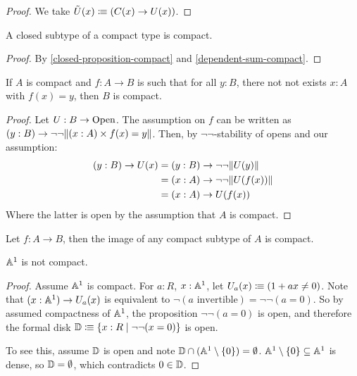 \begin{proof}
  We take $\tilde{U}(x)\vcentcolon\mspace{-1.2mu}\equiv (C(x)\to U(x))$.
\end{proof}

\begin{lemma}
  \label{closed-subtype-compact}
  A closed subtype of a compact type is compact.
\end{lemma}

\begin{proof}
  By \cref{closed-proposition-compact} and \cref{dependent-sum-compact}.
\end{proof}

\begin{lemma}
  \label{not-not-surjection-compact}
  If $A$ is compact and $f:A\to B$ is such that for all $y:B$,
  there not not exists $x:A$ with $f(x)=y$,
  then $B$ is compact.
\end{lemma}

\begin{proof}
  Let $U:B\to\mathrm{Open}$.
  The assumption on $f$ can be written as $(y:B)\to \neg\neg \lVert  (x:A)\times f(x)=y  \rVert$.
  Then, by $\neg\neg$-stability of opens and our assumption:
  \begin{align*}
    (y:B)\to U(x) &= (y:B)\to \neg\neg \lVert  U(y)  \rVert \\
                  &= (x:A)\to \neg\neg \lVert  U(f(x))  \rVert \\
                  &= (x:A)\to U(f(x))
  \end{align*}
  Where the latter is open by the assumption that $A$ is compact.
\end{proof}

\begin{corollary}
  \label{image-compact}
  Let $f:A\to B$, then the image of any compact subtype of $A$ is compact.
\end{corollary}

\begin{proposition}
  $\mathbb{A}^1$ is not compact.
\end{proposition}

\begin{proof}
  Assume $\mathbb{A}^1$ is compact.
  For $a:R$, $x:\mathbb{A}^1$, let $U_a(x)\vcentcolon\mspace{-1.2mu}\equiv (1+ax \neq 0)$.
  Note that $(x:\mathbb{A}^1)\to U_a(x)$ is equivalent to $\neg(\text{$a$ invertible})=\neg\neg(a=0)$.
  So by assumed compactness of $\mathbb{A}^1$, the proposition $\neg\neg(a=0)$ is open,
  and therefore the formal disk $\mathbb{D}\vcentcolon\mspace{-1.2mu}\equiv \{x:R\mid \neg\neg(x=0)\}$ is open.

  To see this, assume $\mathbb{D}$ is open and note $\mathbb{D}\cap (\mathbb{A}^1\setminus\{0\})=\emptyset$.
  $\mathbb{A}^1\setminus\{0\}\subseteq \mathbb{A}^1$ is dense, so $\mathbb{D}=\emptyset$, which contradicts $0\in\mathbb{D}$.
\end{proof}

